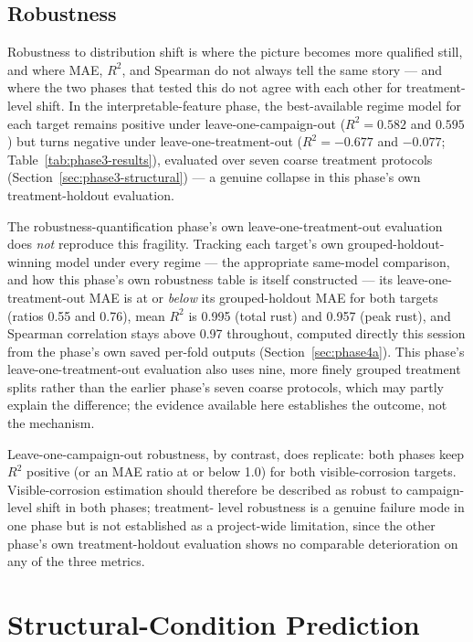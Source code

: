 \subsection{Robustness}

Robustness to distribution shift is where the picture becomes more
qualified still, and where MAE, $R^2$, and Spearman do not always tell the
same story — and where the two phases that tested this do not agree with
each other for treatment-level shift. In the interpretable-feature phase,
the best-available regime model for each target remains positive under
leave-one-campaign-out ($R^2=0.582$ and $0.595$) but turns negative under
leave-one-treatment-out ($R^2=-0.677$ and $-0.077$;
Table~\ref{tab:phase3-results}), evaluated over seven coarse treatment
protocols (Section~\ref{sec:phase3-structural}) — a genuine collapse in
this phase's own treatment-holdout evaluation.

The robustness-quantification phase's own leave-one-treatment-out
evaluation does \emph{not} reproduce this fragility. Tracking each
target's own grouped-holdout-winning model under every regime — the
appropriate same-model comparison, and how this phase's own robustness
table is itself constructed — its leave-one-treatment-out MAE is at or
\emph{below} its grouped-holdout MAE for both targets (ratios 0.55 and
0.76), mean $R^2$ is 0.995 (total rust) and 0.957 (peak rust), and Spearman
correlation stays above 0.97 throughout, computed directly this session
from the phase's own saved per-fold outputs
(Section~\ref{sec:phase4a}). This phase's leave-one-treatment-out
evaluation also uses nine, more finely grouped treatment splits rather
than the earlier phase's seven coarse protocols, which may partly explain
the difference; the evidence available here establishes the outcome, not
the mechanism.

Leave-one-campaign-out robustness, by contrast, does replicate: both
phases keep $R^2$ positive (or an MAE ratio at or below 1.0) for both
visible-corrosion targets. Visible-corrosion estimation should therefore
be described as robust to campaign-level shift in both phases; treatment-
level robustness is a genuine failure mode in one phase but is not
established as a project-wide limitation, since the other phase's own
treatment-holdout evaluation shows no comparable deterioration on any of
the three metrics.

\section{Structural-Condition Prediction}
\label{sec:results-structural}

